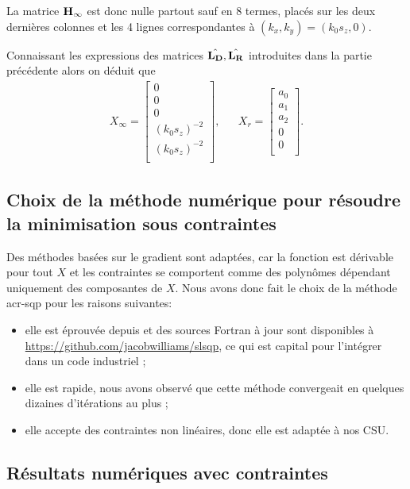 La matrice \({\mathbf{H}}_\infty\) est donc nulle partout sauf en 8 termes, placés sur les deux dernières colonnes et les 4 lignes correspondantes à \((k_x,k_y)=(k_0 s_z,0)\).

Connaissant les expressions des matrices \(\hat{\mathbf{L_D}},\hat{\mathbf{L_R}}\) introduites dans la partie précédente alors on déduit que
\begin{align*}
  X_\infty = \begin{bmatrix}
    0\\
    0\\
    0\\
    (k_0 s_z)^{-2}\\
    (k_0 s_z)^{-2}\\
  \end{bmatrix},
  & &
  X_r = \begin{bmatrix}
  a_0\\
  a_1\\
  a_2\\
  0\\
  0\\
  \end{bmatrix}.
\end{align*}

\subsection{Choix de la méthode numérique pour résoudre la minimisation sous contraintes}

  Des méthodes basées sur le gradient sont adaptées, car la fonction est dérivable pour tout \(X\) et les contraintes se comportent comme des polynômes dépendant uniquement des composantes de \(X\).
  Nous avons donc fait le choix de la méthode \gls{acr-sqp} pour les raisons suivantes:
 
  \begin{itemize}
    \item elle est éprouvée depuis \cite{kraft_software_1988} et des sources Fortran à jour sont disponibles à \url{https://github.com/jacobwilliams/slsqp}, ce qui est capital pour l'intégrer dans un code industriel ;
    \item elle est rapide, nous avons observé que cette méthode convergeait en quelques dizaines d'itérations au plus ;
    \item elle accepte des contraintes non linéaires, donc elle est adaptée à nos CSU.
  \end{itemize}

  \subsection{Résultats numériques avec contraintes}

